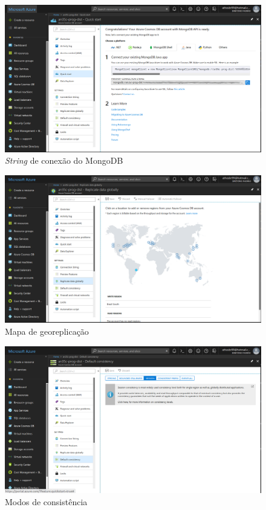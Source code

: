 \documentclass[12pt]{article}
\begin{document}
\begin{figure}[H]
	\label{fig:az3}
	\caption{\textit{String} de conexão do MongoDB}
	\includegraphics[scale=0.37]{img/az3.png}
	\centering
\end{figure}

\begin{figure}[H]
	\label{fig:az4}
	\caption{Mapa de georeplicação}
	\includegraphics[scale=0.37]{img/az4.png}
	\centering
\end{figure}

\begin{figure}[H]
	\label{fig:az5}
	\caption{Modos de consistência}
	\includegraphics[scale=0.37]{img/az5.png}
	\centering
\end{figure}


\end{document}
